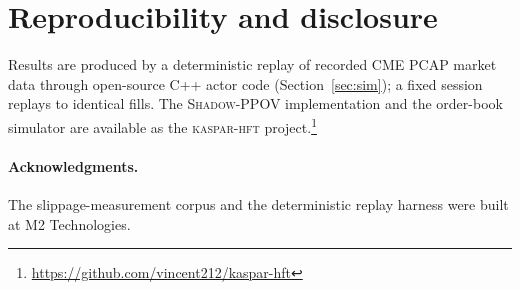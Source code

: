 \documentclass[11pt]{article}
\newcommand{\pov}{\textsc{Shadow-PPOV}}
\begin{document}
\section*{Reproducibility and disclosure}

Results are produced by a deterministic replay of recorded CME PCAP market data
through open-source C++ actor code (Section~\ref{sec:sim}); a fixed session replays
to identical fills. The \pov{}
implementation and the order-book simulator are available as the
\textsc{kaspar-hft} project.\footnote{\url{https://github.com/vincent212/kaspar-hft}}

\paragraph{Acknowledgments.} The slippage-measurement corpus and the
deterministic replay harness were built at M2 Technologies.
\end{document}
